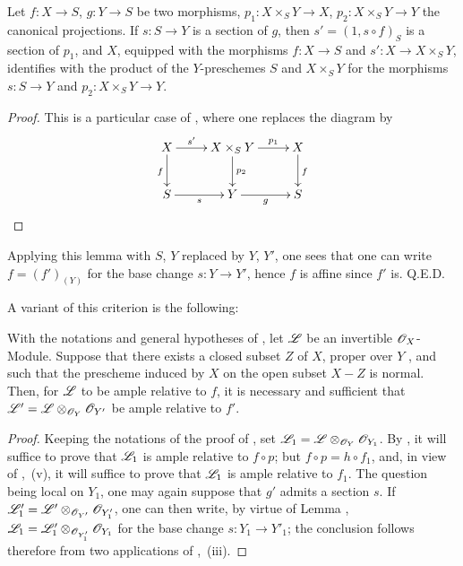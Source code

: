 \begin{lemma}[14.5.11.1]
\label{IV.14.5.11.1}
Let $f:X\to S$, $g:Y\to S$ be two morphisms, $p_1:X\times_S Y\to X$, $p_2:X\times_S Y\to Y$ the canonical projections.
If $s:S\to Y$ is a section of $g$, then $s'=(1,s\circ f)_S$ is a section of $p_1$, and $X$, equipped with the morphisms $f:X\to S$ and $s':X\to X\times_S Y$, identifies with the product of the $Y$-preschemes $S$ and $X\times_S Y$ for the morphisms $s:S\to Y$ and $p_2:X\times_S Y\to Y$.
\end{lemma}

\begin{proof}
This is a particular case of , where one replaces the diagram by
\[
\xymatrix{
  X \ar[r]^-{s'} \ar[d]_f & X\times_S Y \ar[r]^-{p_1} \ar[d]^{p_2} & X \ar[d]^f \\
  S \ar[r]_-{s} & Y \ar[r]_-{g} & S
}
\]
\end{proof}

Applying this lemma with $S$, $Y$ replaced by $Y$, $Y'$, one sees that one can write $f=(f')_{(Y)}$ for the base change $s:Y\to Y'$, hence $f$ is affine since $f'$ is.
Q.E.D.

A variant of this criterion is the following:

\begin{corollary}[14.5.12]
\label{IV.14.5.12}
With the notations and general hypotheses of , let $\mathscr{L}$ be an invertible $\mathscr{O}_X$-Module.
Suppose that there exists a closed subset $Z$ of $X$, proper over $Y$ , and such that the prescheme induced by $X$ on the open subset $X-Z$ is normal.
Then, for $\mathscr{L}$ to be ample relative to $f$, it is necessary and sufficient that $\mathscr{L}'=\mathscr{L}\otimes_{\mathscr{O}_Y}\mathscr{O}_{Y'}$ be ample relative to $f'$.
\end{corollary}

\begin{proof}
Keeping the notations of the proof of , set $\mathscr{L}_1=\mathscr{L}\otimes_{\mathscr{O}_Y}\mathscr{O}_{Y_1}$.
By , it will suffice to prove that $\mathscr{L}_1$ is ample relative to $f\circ p$; but $f\circ p=h\circ f_1$, and, in view of ,~(v), it will suffice to prove that $\mathscr{L}_1$ is ample relative to $f_1$.
The question being local on $Y_1$, one may again suppose that $g'$ admits a section $s$.
If $\mathscr{L}'_1=\mathscr{L}'\otimes_{\mathscr{O}_{Y'}}\mathscr{O}_{Y'_1}$, one can then write, by virtue of Lemma , $\mathscr{L}_1=\mathscr{L}'_1\otimes_{\mathscr{O}_{Y'_1}}\mathscr{O}_{Y_1}$ for the base change $s:Y_1\to Y'_1$; the conclusion follows therefore from two applications of ,~(iii).
\end{proof}

